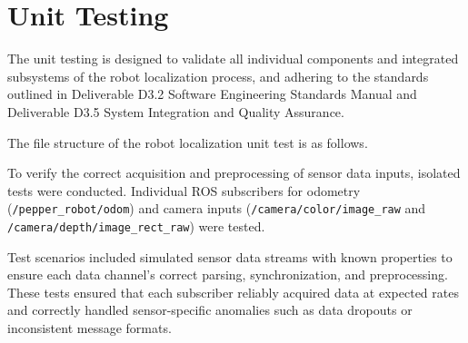 \documentclass{CSSRforAfrica}
\renewcommand{\DTstyle}{\footnotesize\sffamily}
\begin{document}



\newpage


\section{Unit Testing}

The unit testing is designed to validate all individual components and integrated subsystems of the robot localization process, and adhering to the standards outlined in Deliverable D3.2 Software Engineering Standards Manual and Deliverable D3.5 System Integration and Quality Assurance.

The file structure of the robot localization unit test is as follows.

\vspace*{0.5em}

\renewcommand*\DTstyle{\ttfamily}


To verify the correct acquisition and preprocessing of sensor data inputs, isolated tests were conducted. Individual ROS subscribers for odometry (\texttt{/pepper\_robot/odom}) and camera inputs (\texttt{/camera/color\allowbreak/image\_raw} and \texttt{/camera/depth/image\_rect\_raw}) were tested. 

Test scenarios included simulated sensor data streams with known properties to ensure each data channel's correct parsing, synchronization, and preprocessing. These tests ensured that each subscriber reliably acquired data at expected rates and correctly handled sensor-specific anomalies such as data dropouts or inconsistent message formats.
\end{document}
